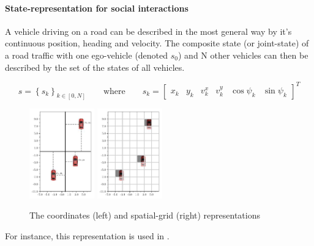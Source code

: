 \documentclass{article}
\begin{document}
\paragraph{State-representation for social interactions}

A vehicle driving on a road can be described in the most general way by it's continuous position, heading and velocity. The composite state (or joint-state) of a road traffic with one ego-vehicle (denoted $s_0$) and N other vehicles can then be described by the set of the states of all vehicles.

\begin{equation*}
s = \left\lbrace s_k \right\rbrace_{k \in [0, N]}\qquad
\text{where}\qquad
s_k = \begin{bmatrix}
x_k & y_k & v^x_k & v^y_k & \cos\psi_k & \sin \psi_k
\end{bmatrix}^T
\end{equation*}


\begin{figure}[tp]
	\centering
	\includegraphics[width=0.25\textwidth]{img/coordinates}
	\includegraphics[width=0.25\textwidth]{img/map}
	\caption{The coordinates (left) and spatial-grid (right) representations}
\end{figure}

For instance, this representation is used in \citep{Bai2015, Gindele2015, Song2016, Sunberg2017, Paxton2017, Galceran2017, Chen2017}.
\end{document}

